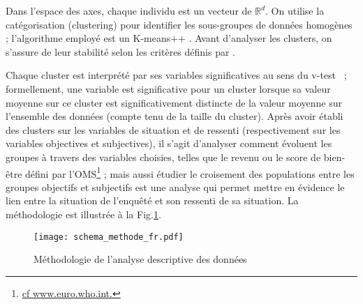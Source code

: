 \documentclass[11pt,fleqn,openany,frenchb]{book} %
\begin{document}
Dans l'espace des axes, chaque individu est un vecteur de $\mathbb{R}^d$. On utilise la catégorisation (clustering) pour identifier les sous-groupes de données homogènes ; l'algorithme employé est un K-means++ \cite{arthur2007k}. Avant d'analyser les clusters, on s'assure de leur stabilité selon les critères définis par \cite{meilua2006uniqueness}. \par

Chaque cluster est interprété par ses variables significatives au sens du v-test \cite{lebart2006statistique}~; formellement, une variable est significative pour un cluster lorsque sa valeur moyenne sur ce cluster est significativement distincte de la valeur moyenne sur l'ensemble des données (compte tenu de la taille du cluster). Après avoir établi des clusters sur les variables de  situation et de ressenti (respectivement sur les variables objectives et subjectives), il s'agit d'analyser comment évoluent les groupes à travers des variables choisies, telles que le revenu ou le score de bien-être défini par l'OMS\footnote{\href{http://www.euro.who.int/fr/publications/abstracts/measurement-of-and-target-setting-for-well-being-an-initiative-by-the-who-regional-office-for-europe}{cf www.euro.who.int.}} ; mais aussi étudier le croisement des populations entre les groupes objectifs et subjectifs est une analyse qui permet mettre en évidence le lien entre la situation de l'enquêté et son ressenti de sa situation. La méthodologie est illustrée à la Fig.\ref{fig:metho}.\par

\begin{figure}[!h]
\centering
\texttt{[image: schema\_methode\_fr.pdf]}
\caption{Méthodologie de l'analyse descriptive des données}
\label{fig:metho}
\end{figure}
\end{document}
